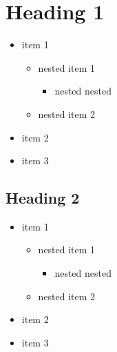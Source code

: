 \documentclass{article}
\begin{document}
 
\setcounter{secnumdepth}{0}

\section{Heading 1}

\begin{itemize}
    \item item 1
    \begin{itemize}
        \item nested item 1
        \begin{itemize}
            \item nested nested
        \end{itemize}

        \item nested item 2
    \end{itemize}

    \item item 2
    \item item 3
\end{itemize}

\subsection{Heading 2}

\begin{itemize}
    \item item 1
    \begin{itemize}
        \item nested item 1
        \begin{itemize}
            \item nested nested
        \end{itemize}

        \item nested item 2
    \end{itemize}

    \item item 2
    \item item 3
\end{itemize}
\end{document}
